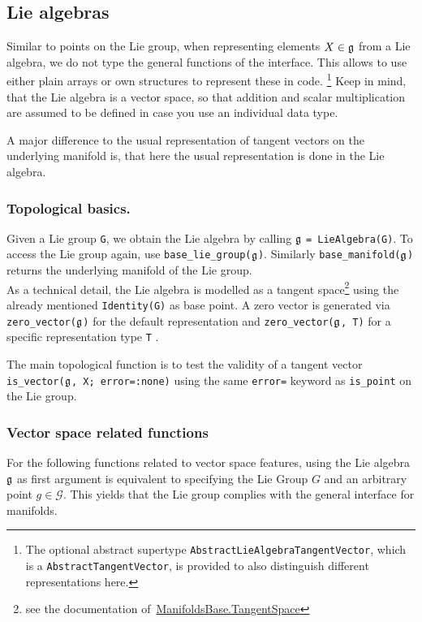 \documentclass{juliacon}
\begin{document}
\subsection{Lie algebras}

Similar to points on the Lie group, when representing elements $X \in \frak g$ from a Lie algebra, we do not type the general functions of the interface.
This allows to use either plain arrays or own structures to represent these in code.
\footnote{The optional abstract supertype \texttt{AbstractLieAlgebraTangentVector}, which is a \texttt{AbstractTangentVector}, is provided to also distinguish different representations here.}
Keep in mind, that the Lie algebra is a vector space, so that addition and scalar multiplication are assumed to be defined in case you use an individual data type.

A major difference to the usual representation of tangent vectors on the underlying manifold is, that here the usual representation is done in the Lie algebra.

\subsubsection*{Topological basics.}
Given a Lie group \verb|G|, we obtain the Lie algebra by calling $\frak g$ \verb|= LieAlgebra(G)|.
To access the Lie group again, use \verb|base_lie_group(|$\frak g$\verb|)|. Similarly \verb|base_manifold(|$\frak g$\verb|)| returns the underlying manifold of the Lie group.\\
As a technical detail, the Lie algebra is modelled as a tangent space\footnote{see the documentation of~\href{https://juliamanifolds.github.io/ManifoldsBase.jl/stable/metamanifolds/\#ManifoldsBase.TangentSpace}{ManifoldsBase.TangentSpace}} using the already mentioned \verb|Identity(G)| as base point.
A zero vector is generated via \verb|zero_vector(|$\frak g$\verb|)| for the default representation and \verb|zero_vector(|$\frak g$\verb|, T)| for a specific representation type \verb|T|%
.

The main topological function is to test the validity of a tangent vector \verb|is_vector(|$\frak g$\verb|, X; error=:none)| using the same \verb|error=| keyword as \verb|is_point| on the Lie group.

\subsubsection*{Vector space related functions}
For the following functions related to vector space features, using the Lie algebra $\frak g$ as first argument is equivalent to specifying the Lie Group $G$ and an arbitrary point $g \in \mathcal G$. This yields that the Lie group complies with the general interface for manifolds.
\end{document}
